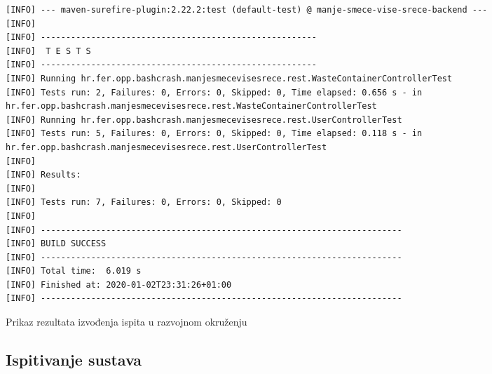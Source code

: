 \begin{listing}[H]
	\begin{verbatim}
[INFO] --- maven-surefire-plugin:2.22.2:test (default-test) @ manje-smece-vise-srece-backend ---
[INFO] 
[INFO] -------------------------------------------------------
[INFO]  T E S T S
[INFO] -------------------------------------------------------
[INFO] Running hr.fer.opp.bashcrash.manjesmecevisesrece.rest.WasteContainerControllerTest
[INFO] Tests run: 2, Failures: 0, Errors: 0, Skipped: 0, Time elapsed: 0.656 s - in hr.fer.opp.bashcrash.manjesmecevisesrece.rest.WasteContainerControllerTest
[INFO] Running hr.fer.opp.bashcrash.manjesmecevisesrece.rest.UserControllerTest
[INFO] Tests run: 5, Failures: 0, Errors: 0, Skipped: 0, Time elapsed: 0.118 s - in hr.fer.opp.bashcrash.manjesmecevisesrece.rest.UserControllerTest
[INFO] 
[INFO] Results:
[INFO] 
[INFO] Tests run: 7, Failures: 0, Errors: 0, Skipped: 0
[INFO] 
[INFO] ------------------------------------------------------------------------
[INFO] BUILD SUCCESS
[INFO] ------------------------------------------------------------------------
[INFO] Total time:  6.019 s
[INFO] Finished at: 2020-01-02T23:31:26+01:00
[INFO] ------------------------------------------------------------------------
	\end{verbatim}
	\caption{Prikaz rezultata izvođenja ispita u razvojnom okruženju}
\end{listing}
			\clearpage

			\subsection{Ispitivanje sustava}
			
